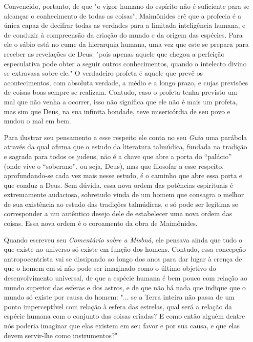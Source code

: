 Convencido, portanto, de que "o vigor humano do espírito não é
suficiente para se alcançar o conhecimento de todas as coisas",
Maimônides crê que a profecia é a única capaz de decifrar todas as
verdades para a limitada inteligência humana, e de conduzir à
compreensão da criação do mundo e da origem das espécies. Para ele o
sábio está no cume da hierarquia humana, uma vez que este se prepara
para receber as revelações de Deus: "pois apenas aque­le que chegou a
perfeição especulativa pode obter a seguir outros conhecimen­tos, quando
o intelecto divino se extravasa sobre ele." O verdadeiro profeta é
aquele que prevê os acontecimentos, com absoluta verdade, a médio e a
lon­go prazo, e cujas previsões de coisas boas sempre se realizam.
Contudo, caso o profeta tenha previsto um mal que não venha a ocorrer,
isso não significa que ele não é mais um profeta, mas sim que Deus, na
sua infinita bondade, teve misericórdia de seu povo e mudou o mal em
bem.

Para ilustrar seu pensamento a esse respeito ele conta no seu
\emph{Guia} uma parábola através da qual afirma que o estudo da
literatura talmúdica, fun­dada na tradição e sagrada para todos os
judeus, não é a chave que abre a porta do ``palácio'' (onde vive o
``soberano'', ou seja, Deus), mas que filosofar a esse respeito,
aprofundando-se cada vez mais nesse estudo, é o caminho que abre essa
porta e que conduz a Deus. Sem dúvida, essa nova ordem das potências
espirituais é extremamente audaciosa, sobretudo vinda de um homem que
con­sagra o melhor de sua existência ao estudo das tradições talmúdicas,
e só pode ser legítima se corresponder a um autêntico desejo dele de
estabelecer uma no­va ordem das coisas. Essa nova ordem é o coroamento
da obra de Maimônides.

Quando escreveu seu \emph{Comentário sobre a Misbná,} ele pensava ain­da
que tudo o que existe no universo só existe em função dos homens.
Contu­do, essa concepção antropocentrista vai se dissipando ao longo dos
anos para dar lugar à crença de que o homem em si não pode ser imaginado
como o últi­mo objetivo do desenvolvimento universal, de que a espécie
humana é bem pouco com relação ao mundo superior das esferas e dos
astros, e de que não há nada que indique que o mundo só existe por causa
do homem: "... se a Ter­ra inteira não passa de um ponto imperceptível
com relação à esfera das estre­las, qual será a relação da espécie
humana com o conjunto das coisas criadas? E como então alguém dentre nós
poderia imaginar que elas existem em seu fa­vor e por sua causa, e que
elas devem servir-lhe como instrumentos?"

